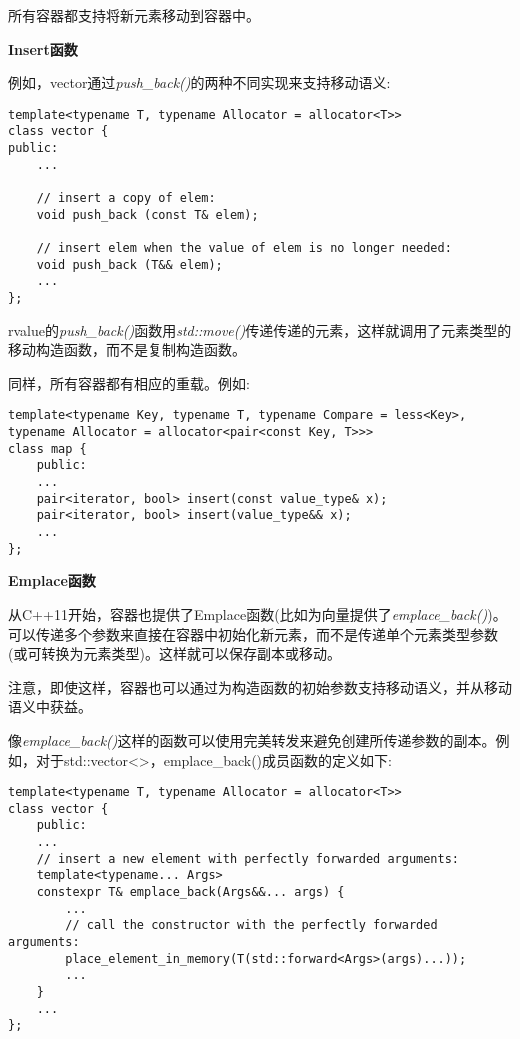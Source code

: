 所有容器都支持将新元素移动到容器中。\par

\hspace*{\fill} \par %
\textbf{Insert函数}

例如，vector通过\textit{push\_back()}的两种不同实现来支持移动语义:\par

\begin{lstlisting}[caption={}]
template<typename T, typename Allocator = allocator<T>>
class vector {
public:
	...
	
	// insert a copy of elem:
	void push_back (const T& elem);
	
	// insert elem when the value of elem is no longer needed:
	void push_back (T&& elem);
	...
};
\end{lstlisting}

rvalue的\textit{push\_back()}函数用\textit{std::move()}传递传递的元素，这样就调用了元素类型的移动构造函数，而不是复制构造函数。\par

同样，所有容器都有相应的重载。例如:\par

\begin{lstlisting}[caption={}]
template<typename Key, typename T, typename Compare = less<Key>,
typename Allocator = allocator<pair<const Key, T>>>
class map {
	public:
	...
	pair<iterator, bool> insert(const value_type& x);
	pair<iterator, bool> insert(value_type&& x);
	...
};
\end{lstlisting}

\hspace*{\fill} \par %
\textbf{Emplace函数}

从C++11开始，容器也提供了Emplace函数(比如为向量提供了\textit{emplace\_back()})。可以传递多个参数来直接在容器中初始化新元素，而不是传递单个元素类型参数(或可转换为元素类型)。这样就可以保存副本或移动。\par

注意，即使这样，容器也可以通过为构造函数的初始参数支持移动语义，并从移动语义中获益。\par

像\textit{emplace\_back()}这样的函数可以使用完美转发来避免创建所传递参数的副本。例如，对于std::vector<>，emplace\_back()成员函数的定义如下:\par

\begin{lstlisting}[caption={}]
template<typename T, typename Allocator = allocator<T>>
class vector {
	public:
	...
	// insert a new element with perfectly forwarded arguments:
	template<typename... Args>
	constexpr T& emplace_back(Args&&... args) {
		...
		// call the constructor with the perfectly forwarded arguments:
		place_element_in_memory(T(std::forward<Args>(args)...));
		...
	}
	...
};
\end{lstlisting}

